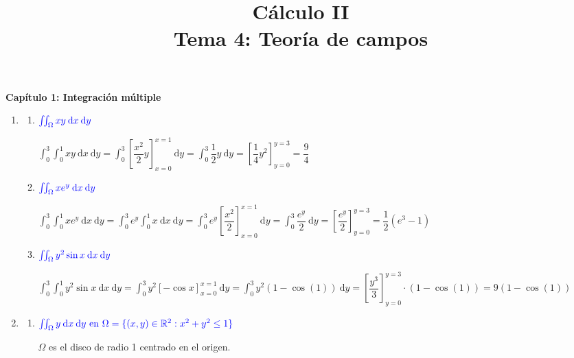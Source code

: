 
\title{Cálculo II\\ Tema 4: Teoría de campos}


\maketitle
\textbf{\Large Capítulo 1: Integración múltiple}

\begin{enumerate}[label=\color{red}\textbf{\arabic*)}, leftmargin=*]
\item {}
\begin{enumerate}[label=\color{red}\textbf{\alph*)}]
\item $\textcolor{blue}{\iint_{\Omega}xy\:\mathrm{d}x\:\mathrm{d}y}$

$\int_{0}^{3}\int_{0}^{1}xy\:\mathrm{d}x\:\mathrm{d}y=\int_{0}^{3}\left[ \dfrac{x^{2}}{2}y \right]_{x=0}^{x=1}\:\mathrm{d}y=\int_{0}^{3}\dfrac{1}{2}y\:\mathrm{d}y=\left[ \dfrac{1}{4}y^{2} \right]_{y=0}^{y=3}=\dfrac{9}{4}$  

\item $\textcolor{blue}{\iint_{\Omega}xe^{ y }\:\mathrm{d}x\:\mathrm{d}y}$

$\int_{0}^{3}\int_{0}^{1}xe^{ y }\:\mathrm{d}x\:\mathrm{d}y=\int_{0}^{3}e^{ y }\int_{0}^{1}x\:\mathrm{d}x\:\mathrm{d}y=\int_{0}^{3}e^{ y }\left[ \dfrac{x^{2}}{2} \right]_{x=0}^{x=1}\:\mathrm{d}y=\int_{0}^{3}\dfrac{e^{ y }}{2}\:\mathrm{d}y=\left[ \dfrac{e^{ y }}{2} \right]_{y=0}^{y=3}=\dfrac{1}{2}(e^{ 3 }-1)$

\item $\textcolor{blue}{\iint_{\Omega}y^{2}\sin x\:\mathrm{d}x\:\mathrm{d}y}$

$\int_{0}^{3}\int_{0}^{1}y^{2}\sin x\:\mathrm{d}x\:\mathrm{d}y=\int_{0}^{3}y^{2}\left[ -\cos x \right]_{x=0}^{x=1}\:\mathrm{d}y=\int_{0}^{3}y^{2}(1-\cos(1))\:\mathrm{d}y=\left[ \dfrac{y^{3}}{3} \right]_{y=0}^{y=3}\cdot(1-\cos(1))=9(1-\cos(1))$ 

\end{enumerate}

\item {}
\begin{enumerate}[label=\color{red}\textbf{\alph*)}]
\item $\textcolor{blue}{\iint_{\Omega}y\:\mathrm{d}x\:\mathrm{d}y\text{ en }\Omega=\{ (x,y)\in\mathbb{R}^{2}: x^{2}+y^{2}\leq 1 \}}$

$\Omega$ es el disco de radio 1 centrado en el origen.


\end{enumerate}
\end{enumerate}
